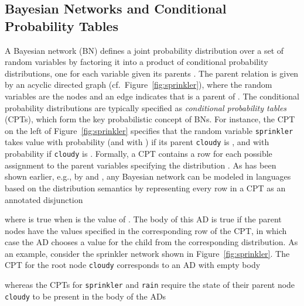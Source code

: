 \documentclass[a4paper]{article}
\begin{document}
\subsection{Bayesian Networks and Conditional Probability Tables}
A Bayesian network (BN) defines a joint probability distribution over a set
of random variables  by factoring it into a product
of conditional probability distributions, one for each variable 
given its parents . The parent relation
is given by an acyclic directed graph (cf.~Figure~\ref{fig:sprinkler}), where the random variables are
the nodes and an edge  indicates that  is a
parent of . The conditional probability distributions are
typically specified as 
\emph{conditional probability tables} (CPTs), which form the key
probabilistic concept of BNs.  
For
instance, the CPT on the left of Figure~\ref{fig:sprinkler} specifies
that the random variable \verb|sprinkler| takes value  with
probability  (and  with ) if its parent \verb|cloudy| is , and with
probability  if \verb|cloudy| is . 
Formally, a CPT
contains a row for each possible assignment  to the
parent variables  
specifying the distribution . As has been shown earlier, e.g., by \cite{Poole:93}
and \cite{Vennekens04}, any Bayesian network can be modeled  in
languages based on the distribution semantics by representing  
 every row in a CPT 
as an annotated disjunction

where  is true when  is the value of . The body of this AD
is true if the parent nodes have the values specified in the
corresponding row of the CPT, in which case the AD chooses a value for
the child from the corresponding distribution. As an example,
consider the sprinkler network shown in Figure~\ref{fig:sprinkler}. The CPT for the root node
\texttt{cloudy} corresponds to an AD with empty body

whereas the CPTs for \texttt{sprinkler} and \texttt{rain} require the
state of their parent node \texttt{cloudy} to be present in the body
of the ADs
\end{document}
